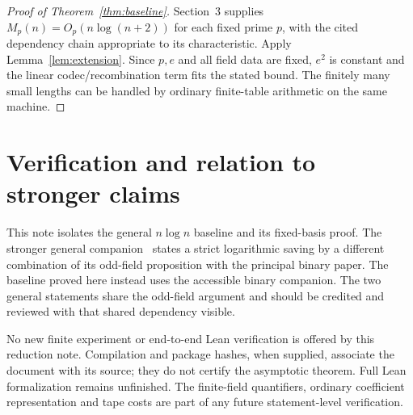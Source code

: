 \documentclass[11pt]{article}
\begin{document}
\begin{proof}[Proof of Theorem~\ref{thm:baseline}]
Section~3 supplies $M_p(n)=O_p(n\log(n+2))$ for each fixed prime
$p$, with the cited dependency chain appropriate to its characteristic.
Apply Lemma~\ref{lem:extension}. Since $p,e$ and all field data
are fixed, $e^2$ is constant and the linear codec/recombination term
fits the stated bound. The finitely many small lengths can be
handled by ordinary finite-table arithmetic on the same machine.
\end{proof}

\section{Verification and relation to stronger claims}
This note isolates the general $n\log n$ baseline and its fixed-basis
proof. The stronger general companion~\cite{GeneralBest} states
a strict logarithmic saving by a different combination of its
odd-field proposition with the principal binary paper. The baseline
proved here instead uses the accessible binary companion. The two
general statements share the odd-field argument and should be
credited and reviewed with that shared dependency visible.

No new finite experiment or end-to-end Lean verification is offered
by this reduction note. Compilation and package hashes, when supplied,
associate the document with its source; they do not certify the
asymptotic theorem. Full Lean formalization remains unfinished.
The finite-field quantifiers, ordinary coefficient representation
and tape costs are part of any future statement-level verification.
\end{document}
